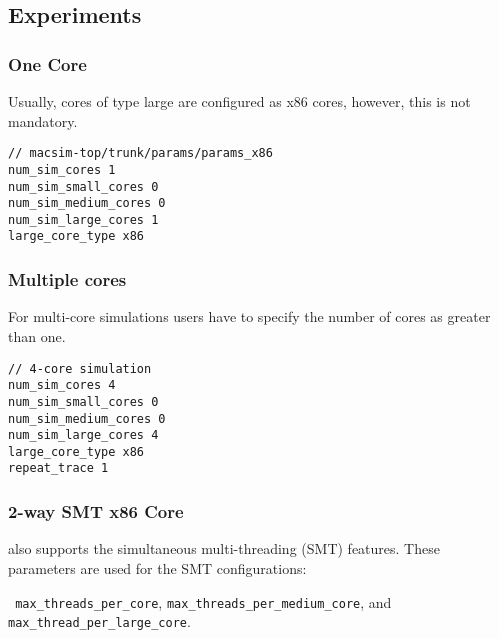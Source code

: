 \subsection{\cpu Experiments}


\subsubsection{One \cpu Core}

Usually, cores of type large are configured as x86 cores, however, this is not
mandatory. 

\begin{Verbatim}
// macsim-top/trunk/params/params_x86
num_sim_cores 1
num_sim_small_cores 0
num_sim_medium_cores 0
num_sim_large_cores 1
large_core_type x86
\end{Verbatim}


\subsubsection{Multiple \cpu cores}

For multi-core simulations users have to specify the number of cores as greater than one.


\begin{Verbatim}
// 4-core simulation
num_sim_cores 4
num_sim_small_cores 0
num_sim_medium_cores 0
num_sim_large_cores 4
large_core_type x86
repeat_trace 1
\end{Verbatim}



\subsubsection{2-way SMT x86 Core}
\SIM also supports the simultaneous multi-threading (SMT) features.
These parameters are used for the SMT configurations:

\Verb+ max_threads_per_core+, \Verb+max_threads_per_medium_core+, and
\Verb+max_thread_per_large_core+. 

